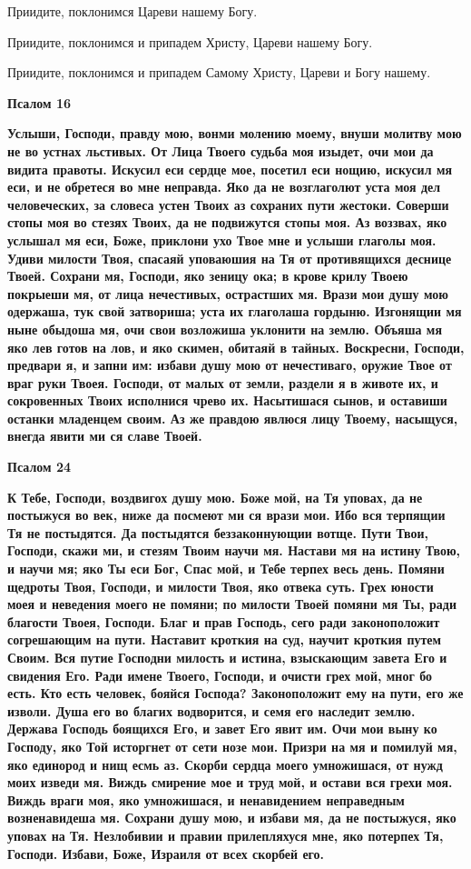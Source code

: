 Приидите, поклонимся Цареви нашему Богу.



Приидите, поклонимся и припадем Христу, Цареви нашему Богу.



Приидите, поклонимся и припадем Самому Христу, Цареви и Богу нашему.


\medskip
\bfseries Псалом 16\normalfont{}


\bfseries \normalfont{}Услыши, Господи, правду мою, вонми молению моему, внуши молитву мою не во устнах льстивых. От Лица Твоего судьба моя изыдет, очи мои да видита правоты. Искусил еси сердце мое, посетил еси нощию, искусил мя еси, и не обретеся во мне неправда. Яко да не возглаголют уста моя дел человеческих, за словеса устен Твоих аз сохраних пути жестоки. Соверши стопы моя во стезях Твоих, да не подвижутся стопы моя. Аз воззвах, яко услышал мя еси, Боже, приклони ухо Твое мне и услыши глаголы моя. Удиви милости Твоя, спасаяй уповаюшия на Тя от противящихся деснице Твоей. Сохрани мя, Господи, яко зеницу ока; в крове крилу Твоею покрыеши мя, от лица нечестивых, острастших мя. Врази мои душу мою одержаша, тук свой затвориша; уста их глаголаша гордыню. Изгонящии мя ныне обыдоша мя, очи свои возложиша уклонити на землю. Объяша мя яко лев готов на лов, и яко скимен, обитаяй в тайных. Воскресни, Господи, предвари я, и запни им: избави душу мою от нечестиваго, оружие Твое от враг руки Твоея. Господи, от малых от земли, раздели я в животе их, и сокровенных Твоих исполнися чрево их. Насытишася сынов, и оставиши останки младенцем своим. Аз же правдою явлюся лицу Твоему, насыщуся, внегда явити ми ся славе Твоей.


\medskip
\bfseries Псалом 24\normalfont{}


\bfseries \normalfont{}К Тебе, Господи, воздвигох душу мою. Боже мой, на Тя уповах, да не постыжуся во век, ниже да посмеют ми ся врази мои. Ибо вся терпящии Тя не постыдятся. Да постыдятся беззаконнующии вотще. Пути Твои, Господи, скажи ми, и стезям Твоим научи мя. Настави мя на истину Твою, и научи мя; яко Ты еси Бог, Спас мой, и Тебе терпех весь день. Помяни щедроты Твоя, Господи, и милости Твоя, яко отвека суть. Грех юности моея и неведения моего не помяни; по милости Твоей помяни мя Ты, ради благости Твоея, Господи. Благ и прав Господь, сего ради законоположит согрешающим на пути. Наставит кроткия на суд, научит кроткия путем Своим. Вся путие Господни милость и истина, взыскающим завета Его и свидения Его. Ради имене Твоего, Господи, и очисти грех мой, мног бо есть. Кто есть человек, бояйся Господа? Законоположит ему на пути, его же изволи. Душа его во благих водворится, и семя его наследит землю. Держава Господь боящихся Его, и завет Его явит им. Очи мои выну ко Господу, яко Той исторгнет от сети нозе мои. Призри на мя и помилуй мя, яко единород и нищ есмь аз. Скорби сердца моего умножишася, от нужд моих изведи мя. Виждь смирение мое и труд мой, и остави вся грехи моя. Виждь враги моя, яко умножишася, и ненавидением неправедным возненавидеша мя. Сохрани душу мою, и избави мя, да не постыжуся, яко уповах на Тя. Незлобивии и правии прилепляхуся мне, яко потерпех Тя, Господи. Избави, Боже, Израиля от всех скорбей его.


